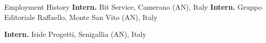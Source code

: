 \begin{rubric}{Employment History}
\entry*[2017]%
	\textbf{Intern.} Bit Service, Camerano (AN), Italy
%
%
\entry*[2017]%
	\textbf{Intern.} Gruppo Editoriale Raffaello, Monte San Vito (AN), Italy

\entry*[2016]%
	\textbf{Intern.} Iride Progetti, Senigallia (AN), Italy
%
\end{rubric}